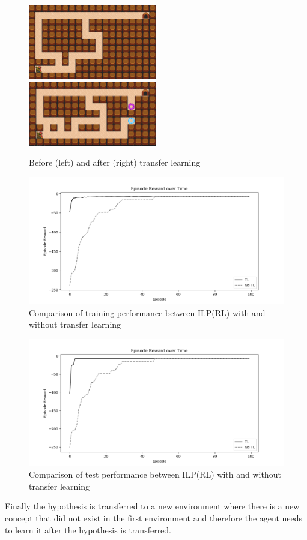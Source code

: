 \begin{figure}[!htb]
\centerline{
\includegraphics[width=0.5\textwidth]{./figures/experiment4_before}
\includegraphics[width=0.5\textwidth]{./figures/experiment5_after}
}
\caption{Before (left) and after (right) transfer learning}
\label{experiment5}
\end{figure}

\begin{figure}[!htb]
\centering
\includegraphics[width=1.0\textwidth]{./figures/experiment5_training}
\caption{Comparison of training performance between ILP(RL) with and without transfer learning}
\label{experiment3_training}
\end{figure}

\begin{figure}[!htb]
\centering
\includegraphics[width=1.0\textwidth]{./figures/experiment5_test}
\caption{Comparison of test performance between ILP(RL) with and without transfer learning}
\label{experiment3_test}
\end{figure}
    

Finally the hypothesis is transferred to a new environment where there is a new concept that did not exist in the first environment
and therefore the agent needs to learn it after the hypothesis is transferred.
